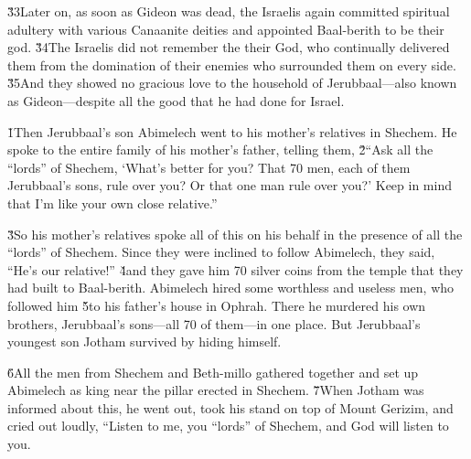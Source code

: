 \v{33}Later on, as soon as Gideon was dead, the Israelis again committed spiritual adultery with various Canaanite deities and appointed Baal-berith to be their god. \v{34}The Israelis did not remember the  their God, who continually delivered them from the domination of their enemies who surrounded them on every side. \v{35}And they showed no gracious love to the household of Jerubbaal---also known as Gideon---despite all the good that he had done for Israel.

\v{1}Then Jerubbaal's son Abimelech went to his mother's relatives in Shechem. He spoke to the entire family of his mother's father, telling them, \v{2}``Ask all the ``lords'' of Shechem, `What's better for you? That 70 men, each of them Jerubbaal's sons, rule over you? Or that one man rule over you?' Keep in mind that I'm like your own close relative.''

\v{3}So his mother's relatives spoke all of this on his behalf in the presence of all the ``lords'' of Shechem. Since they were inclined to follow Abimelech, they said, ``He's our relative!'' \v{4}and they gave him 70 silver coins from the temple that they had built to Baal-berith. Abimelech hired some worthless and useless men, who followed him \v{5}to his father's house in Ophrah. There he murdered his own brothers, Jerubbaal's sons---all 70 of them---in one place. But Jerubbaal's youngest son Jotham survived by hiding himself.

\v{6}All the men from Shechem and Beth-millo gathered together and set up Abimelech as king near the pillar erected in Shechem. \v{7}When Jotham was informed about this, he went out, took his stand on top of Mount Gerizim, and cried out loudly, ``Listen to me, you ``lords'' of Shechem, and God will listen to you.

